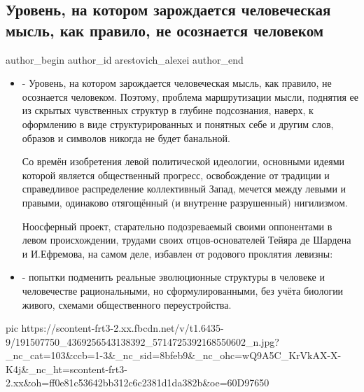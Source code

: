  
 
 
 
 
 
\subsection{Уровень, на котором зарождается человеческая мысль, как правило, не осознается человеком}
\label{sec:28_05_2021.fb.arestovich_alexei.1.myshlenie_bulychev_kir}
\ifcmt
 author_begin
   author_id arestovich_alexei
 author_end
\fi

\begin{itemize}
\item - Уровень, на котором зарождается человеческая мысль, как правило, не
осознается человеком.  Поэтому, проблема маршрутизации мысли, поднятия ее из
скрытых чувственных структур в глубине подсознания, наверх, к оформлению в виде
структурированных и понятных себе и другим слов, образов и символов никогда не
будет банальной.

Со времён изобретения левой политической идеологии, основными идеями которой
является общественный прогресс, освобождение от традиции и справедливое
распределение коллективный Запад, мечется между левыми и правыми, одинаково
отягощённый (и внутренне разрушенный) нигилизмом.

Ноосферный проект, старательно подозреваемый своими оппонентами в левом
происхождении, трудами своих отцов-основателей Тейяра де Шардена и И.Ефремова,
на самом деле, избавлен от родового проклятия левизны:

\item - попытки подменить реальные эволюционные структуры в человеке и человечестве
рациональными, но сформулированными, без учёта биологии живого, схемами
общественного переустройства.
\end{itemize}

\ifcmt
  pic https://scontent-frt3-2.xx.fbcdn.net/v/t1.6435-9/191507750_4369256543138392_5714725392168550602_n.jpg?_nc_cat=103&ccb=1-3&_nc_sid=8bfeb9&_nc_ohc=wQ9A5C_KrVkAX-X-K4j&_nc_ht=scontent-frt3-2.xx&oh=ff0e81c53642bb312c6c2381d1da382b&oe=60D97650
\fi


